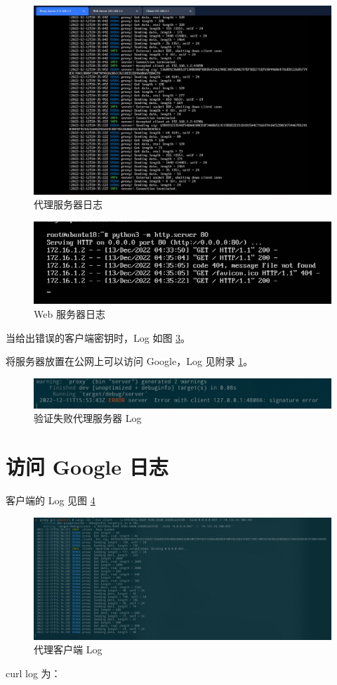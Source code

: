 \documentclass{ctexart}
\begin{document}
  \begin{figure}
    \includegraphics[width=\textwidth]{server.jpg}
    \caption{代理服务器日志}
    \label{fig:server}
  \end{figure}

  \begin{figure}
    \includegraphics[width=\textwidth]{web.jpg}
    \caption{Web 服务器日志}
    \label{fig:web}
  \end{figure}

  当给出错误的客户端密钥时，Log 如图 \ref{fig:wrong-cred}。

  将服务器放置在公网上可以访问 Google，Log 见附录 \ref{result:google}。

  \begin{figure}
    \includegraphics[width=\textwidth]{sig.jpg}
    \caption{验证失败代理服务器 Log}
    \label{fig:wrong-cred}
  \end{figure}

  \appendix
  \section{访问 Google 日志}
  \label{result:google}

  客户端的 Log 见图 \ref{fig:client-google}

  \begin{figure}
    \includegraphics[width=\textwidth]{client-log-google.jpg}
    \caption{代理客户端 Log}
    \label{fig:client-google}
  \end{figure}

  curl log 为：

  \inputminted[breaklines,breakanywhere]{text}{curl-log-google.txt}
\end{document}
